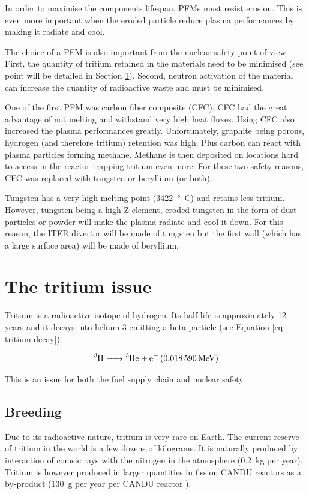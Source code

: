 In order to maximise the components lifespan, PFMs must resist erosion.
This is even more important when the eroded particle reduce plasma performances by making it radiate and cool.

The choice of a PFM is also important from the nuclear safety point of view.
First, the quantity of tritium retained in the materials need to be minimised (see point will be detailed in Section \ref{the tritium issue}).
Second, neutron activation of the material can increase the quantity of radioactive waste and must be minimised.

One of the first PFM was carbon fiber composite (CFC).
CFC had the great advantage of not melting and withstand very high heat fluxes.
Using CFC also increased the plasma performances greatly.
Unfortunately, graphite being porous, hydrogen (and therefore tritium) retention was high.
Plus carbon can react with plasma particles forming methane.
Methane is then deposited on locations hard to access in the reactor trapping tritium even more.
For these two safety reasons, CFC was replaced with tungsten or beryllium (or both).

Tungsten has a very high melting point (\SI{3422}{°C}) and retains less tritium.
However, tungsten being a high-Z element, eroded tungsten in the form of dust particles or powder will make the plasma radiate and cool it down.
For this reason, the ITER divertor will be made of tungsten but the first wall (which has a large surface area) will be made of beryllium.

\section{The tritium issue} \label{the tritium issue}

Tritium is a radioactive isotope of hydrogen.
Its half-life is approximately 12 years and it decays into helium-3 emitting a beta particle (see Equation \ref{eq: tritium decay}).

\begin{equation}
    \ce{^3H -> ^3He + e^- (\SI{0.018590}{MeV})}
    \label{eq: tritium decay}
\end{equation}

This is an issue for both the fuel supply chain and nuclear safety.

\subsection{Breeding}
Due to its radioactive nature, tritium is very rare on Earth.
The current reserve of tritium in the world is a few dozens of kilograms.
It is naturally produced by interaction of comsic rays with the nitrogen in the atmosphere (\SI{0.2}{kg} per year).
Tritium is however produced in larger quantities in fission CANDU reactors as a by-product (\SI{130}{g} per year per CANDU reactor ).

